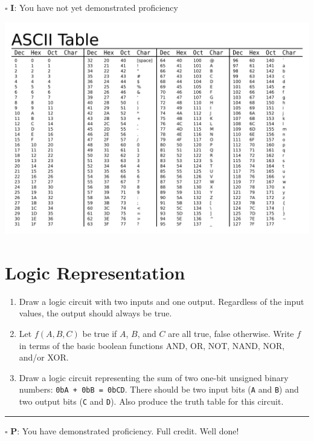 \documentclass[12pt]{article}
\begin{document}
$\square$ \textbf{I}: You have not yet demonstrated proficiency

\newpage

\includegraphics[width=\textwidth]{wikimedia-ascii-table.png}

\newpage



\section*{Logic Representation}

\begin{enumerate}
\item Draw a logic circuit with two inputs and one output. Regardless of the input values, the output should always be true.
\vfill

\item Let $f(A, B, C)$ be true if $A$, $B$, and $C$ are all true, false otherwise. Write $f$ in terms of the basic boolean functions AND, OR, NOT, NAND, NOR, and/or XOR. 
\vfill

\item Draw a logic circuit representing the sum of two one-bit unsigned binary numbers: \texttt{0bA + 0bB = 0bCD}. There should be two input bits (\texttt{A} and \texttt{B}) and two output bits (\texttt{C} and \texttt{D}). Also produce the truth table for this circuit.
\vfill
\end{enumerate}

\vfill

\rule[1ex]{\textwidth}{.1pt}

$\square$ \textbf{P}: You have demonstrated proficiency. Full credit. Well done!
\end{document}
